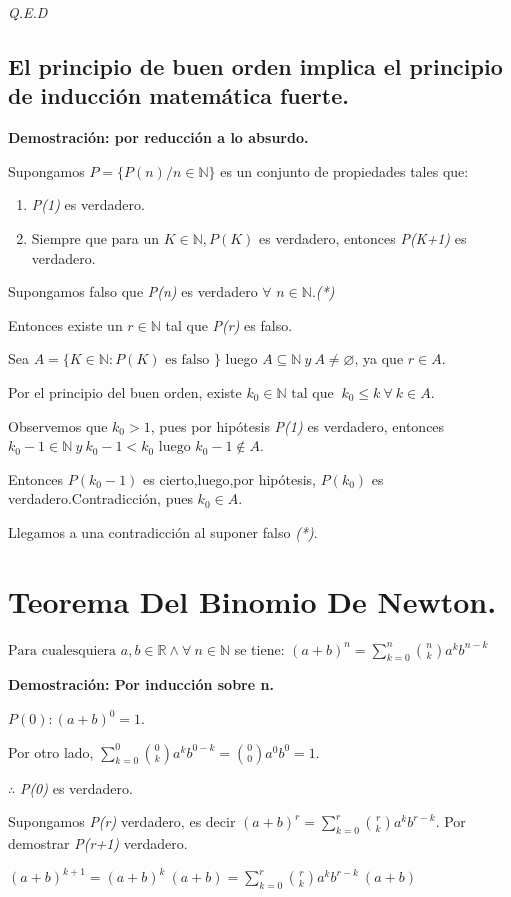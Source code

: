 \documentclass{book}
\begin{document}
\textit{Q.E.D}

\subsection{El principio de buen orden implica el principio de inducción matemática fuerte.}

\textbf{Demostración: por reducción a lo absurdo.}

Supongamos $P=\lbrace P(n)/n\in{\mathbb{N}}\rbrace$ es un conjunto de propiedades tales que:
\begin{enumerate}[1.]
\item \textit{P(1)} es verdadero.
\item Siempre que para un $K\in{\mathbb{N}},P(K)$ es verdadero, entonces \textit{P(K+1)} es verdadero.
\end{enumerate}
Supongamos falso que \textit{P(n)} es verdadero $\forall$ $n\in{\mathbb{N}}$.\textit{(*)}

Entonces existe un $r\in{\mathbb{N}}$ tal que \textit{P(r)} es falso.

Sea $A=\lbrace K\in{\mathbb{N}}:P(K)\mbox{ es falso }\rbrace$ luego $A\subseteq{\mathbb{N}} \ y \ A\neq{\varnothing}$, ya que $r\in{A}$.

Por el principio del buen orden, existe $k_{0}\in{\mathbb{N}}\mbox{ tal que } \ k_{0}\le{k} \ \forall \ k\in{A}$.

Observemos que $k_{0}>1$, pues por hipótesis \textit{P(1)} es verdadero, entonces $k_{0}-1\in{\mathbb{N}} \ y \ k_{0}-1<k_{0}\mbox{ luego }k_{0}-1\not\in{A}$.

Entonces $P(k_{0}-1)$ es cierto,luego,por hipótesis, $P(k_{0})$ es verdadero.Contradicción, pues $k_{0}\in{A}$.

Llegamos a una contradicción al suponer falso \textit{(*)}.
  
\section{Teorema Del Binomio De Newton.}
$\mbox{Para cualesquiera }a,b\in{\mathbb{R}}\land \forall \ n\in{\mathbb{N}}$ se tiene:
$(a+b)^n=\sum_{k=0}^n \binom{n}{k} a^kb^{n-k}$

\textbf{Demostración: Por inducción sobre n.}

$P(0):(a+b)^0=1$.

Por otro lado, $\sum_{k=0}^0 \binom{0}{k} a^kb^{0-k}=\binom{0}{0}a^0b^0=1$.

$\therefore$ \textit{P(0)} es verdadero.

Supongamos \textit{P(r)} verdadero, es decir $(a+b)^r=\sum_{k=0}^r \binom{r}{k} a^kb^{r-k}$.
Por demostrar \textit{P(r+1)} verdadero.

$(a+b)^{k+1}=(a+b)^k \ (a+b)=\sum_{k=0}^r \binom{r}{k} a^kb^{r-k} \ (a+b)$
\end{document}
